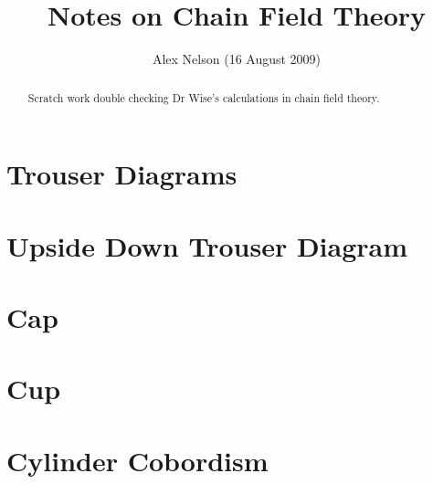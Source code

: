 \documentclass{amsart}
\title{Notes on Chain Field Theory}
\author{Alex Nelson (16 August 2009)}
\numberwithin{equation}{section}
\begin{document}
\maketitle
\begin{abstract}
Scratch work double checking Dr Wise's calculations in chain
field theory.
\end{abstract}
\section{Trouser Diagrams}


\section{Upside Down Trouser Diagram}

\pagebreak
\section{Cap}


\section{Cup}


\pagebreak
\section{Cylinder Cobordism}


\nocite{*}


\end{document}
